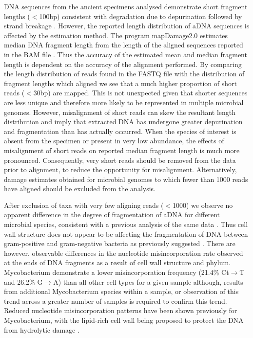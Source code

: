 \documentclass[12pt, a4paper]{article}
\begin{document}
DNA sequences from the ancient specimens analysed demonstrate short fragment lengths ($<$100bp) consistent with degradation due to depurination followed by strand breakage \cite{Briggs:2007aa,Brotherton:2007aa}.
However, the reported length distribution of aDNA sequences is affected by the estimation method.
The program mapDamage2.0 estimates median DNA fragment length from the length of the aligned sequences reported in the BAM file \cite{Jonsson:2013aa}. 
Thus the accuracy of the estimated mean and median fragment length is dependent on the accuracy of the alignment performed.
By comparing the length distribution of reads found in the FASTQ file with the distribution of fragment lengths which aligned we see that a much higher proportion of short reads ($<$30bp) are mapped. 
This is not unexpected given that shorter sequences are less unique and therefore more likely to be represented in multiple microbial genomes. 
However, misalignment of short reads can skew the resultant length distribution and imply that extracted DNA has undergone greater depurination and fragmentation than has actually occurred.
When the species of interest is absent from the specimen or present in very low abundance, the effects of misalignment of short reads on reported median fragment length is much more pronounced.
Consequently, very short reads should be removed from the data prior to alignment, to reduce the opportunity for misalignment.
Alternatively, damage estimates obtained for microbial genomes to which fewer than 1000 reads have aligned should be excluded from the analysis.

After exclusion of taxa with very few aligning reads ($<$1000) we observe no apparent difference in the degree of fragmentation of aDNA for different microbial species, consistent with a previous analysis of the same data \cite{Weyrich:2017aa}. 
Thus cell wall structure does not appear to be affecting the fragmentation of DNA between gram-positive and gram-negative bacteria as previously suggested \cite{Ziesemer:2015aa}. 
There are however, observable differences in the nucleotide misincorporation rate observed at the ends of DNA fragments as a result of cell wall structure and phylum.
Mycobacterium demonstrate a lower misincorporation frequency (21.4\% Ct$\to$T and 26.2\% G$\to$A) than all other cell types for a given sample although, results from additional Mycobacterium species within a sample, or observation of this trend across a greater number of samples is required to confirm this trend.
Reduced nucleotide misincorporation patterns have been shown previously for Mycobacterium, with the lipid-rich cell wall being proposed to protect the DNA from hydrolytic damage \cite{Schuenemann:2013aa}.
\end{document}
